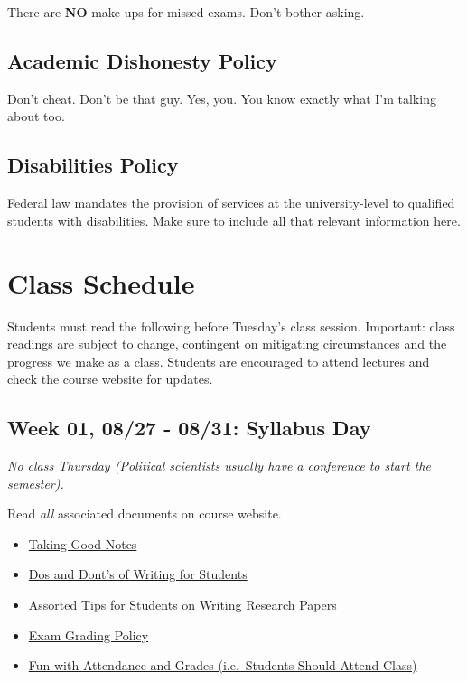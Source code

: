 \documentclass[11pt,]{article}
\providecommand{\tightlist}{%
  \setlength{\itemsep}{0pt}\setlength{\parskip}{0pt}}
\begin{document}
There are \textbf{NO} make-ups for missed exams. Don't bother asking.

\hypertarget{academic-dishonesty-policy}{%
\subsection{Academic Dishonesty
Policy}\label{academic-dishonesty-policy}}

Don't cheat. Don't be that guy. Yes, you. You know exactly what I'm
talking about too.

\hypertarget{disabilities-policy}{%
\subsection{Disabilities Policy}\label{disabilities-policy}}

Federal law mandates the provision of services at the university-level
to qualified students with disabilities. Make sure to include all that
relevant information here.

\newpage

\hypertarget{class-schedule}{%
\section{Class Schedule}\label{class-schedule}}

Students must read the following before Tuesday's class session.
Important: class readings are subject to change, contingent on
mitigating circumstances and the progress we make as a class. Students
are encouraged to attend lectures and check the course website for
updates.

\hypertarget{week-01-0827---0831-syllabus-day}{%
\subsection{Week 01, 08/27 - 08/31: Syllabus
Day}\label{week-01-0827---0831-syllabus-day}}

\emph{No class Thursday (Political scientists usually have a conference
to start the semester).}

Read \emph{all} associated documents on course website.

\begin{itemize}
\tightlist
\item
  \href{http://svmiller.com/blog/2014/09/taking-good-notes/}{Taking Good
  Notes}
\item
  \href{http://svmiller.com/blog/2015/06/dos-and-donts-of-writing-for-students/}{Dos
  and Dont's of Writing for Students}
\item
  \href{http://svmiller.com/blog/2015/12/assorted-tips-students-research-papers/}{Assorted
  Tips for Students on Writing Research Papers}
\item
  \href{https://www.dropbox.com/s/apihjs7di81aqcv/svm-exam-grading-policy.pdf?dl=0}{Exam
  Grading Policy}
\item
  \href{http://svmiller.com/blog/2016/05/fun-with-attendance-grades/}{Fun
  with Attendance and Grades (i.e.~Students Should Attend Class)}
\end{itemize}
\end{document}
